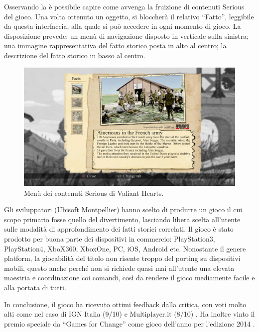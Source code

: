 Osservando la \myfig{\ref{fig:vhUIFacts}} è possibile capire come avvenga la fruizione di contenuti Serious del gioco. Una volta ottenuto un oggetto, si bloccherà il relativo ``Fatto'', leggibile da questa interfaccia, alla quale si può accedere in ogni momento di gioco.
La disposizione prevede: un menù di navigazione disposto in verticale sulla sinistra; una immagine rappresentativa del fatto storico posta in alto al centro; la descrizione del fatto storico in basso al centro.
\begin{figure}[h]
\centerline{\includegraphics[scale=0.22]{images/statoarte/vhUIFacts.jpg}}
\caption{Menù dei contenuti Serious di Valiant Hearts.}
\label{fig:vhUIFacts}
\end{figure}

Gli sviluppatori (Ubisoft Montpellier) hanno scelto di produrre un gioco il cui scopo primario fosse quello del divertimento, lasciando libera scelta all'utente sulle modalità di approfondimento dei fatti storici correlati. Il gioco è stato prodotto per buona parte dei dispositivi in commercio: PlayStation3, PlayStation4, XboX360, XboxOne, PC, iOS, Android etc. Nonostante il genere platform, la giocabilità del titolo non risente troppo del porting su dispositivi mobili, questo anche perché non si richiede quasi mai all'utente una elevata maestria e coordinazione coi comandi, così da rendere il gioco mediamente facile e alla portata di tutti.

In conclusione, il gioco ha ricevuto ottimi feedback dalla critica, con voti molto alti come nel caso di IGN Italia (9/10) e Multiplayer.it (8/10) \cite{ignitalia} \cite{multiplayerit}. Ha inoltre vinto il premio speciale da ``Games for Change'' come gioco dell'anno per l'edizione 2014 \cite{gamesforchange}.



